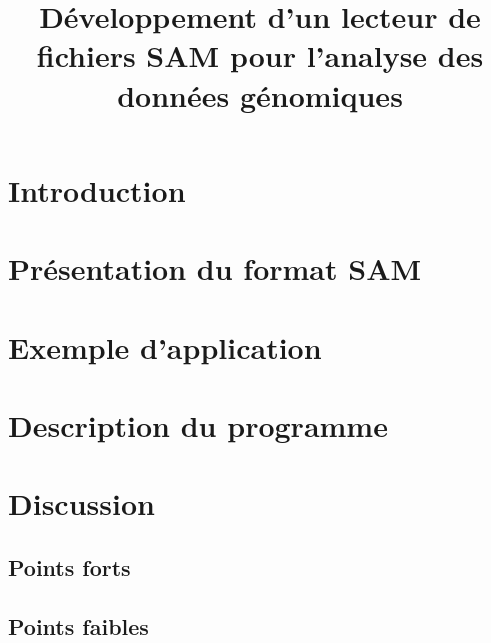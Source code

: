 \documentclass[11pt]{article}
\begin{document}
\title{Développement d'un lecteur de fichiers SAM pour l'analyse des données génomiques}
\maketitle

\section{Introduction}\label{sec:introduction}


\section{Présentation du format SAM}\label{sec:presentation-du-format-sam}


\section{Exemple d'application}\label{sec:exemple-d'application}


\section{Description du programme}\label{sec:description-du-programme}


\section{Discussion}\label{sec:discussion}
\subsection{Points forts}\label{subsec:points-forts}

\subsection{Points faibles}\label{subsec:points-faibles}
\end{document}
